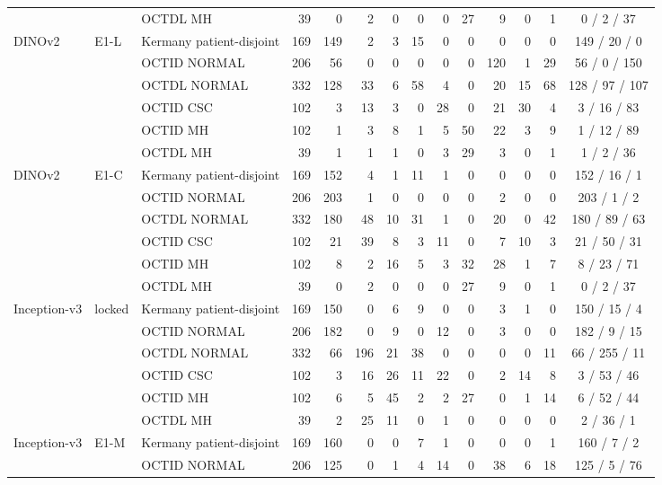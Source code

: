 \begin{longtable}{@{}lll rrrrrrrrrrc@{}}
 &  & OCTDL MH & 39 & 0 & 2 & 0 & 0 & 0 & 27 & 9 & 0 & 1 & 0 / 2 / 37 \\
\addlinespace[1pt]
DINOv2 & E1-L & Kermany patient-disjoint & 169 & 149 & 2 & 3 & 15 & 0 & 0 & 0 & 0 & 0 & 149 / 20 / 0 \\
 &  & OCTID NORMAL & 206 & 56 & 0 & 0 & 0 & 0 & 0 & 120 & 1 & 29 & 56 / 0 / 150 \\
 &  & OCTDL NORMAL & 332 & 128 & 33 & 6 & 58 & 4 & 0 & 20 & 15 & 68 & 128 / 97 / 107 \\
 &  & OCTID CSC & 102 & 3 & 13 & 3 & 0 & 28 & 0 & 21 & 30 & 4 & 3 / 16 / 83 \\
 &  & OCTID MH & 102 & 1 & 3 & 8 & 1 & 5 & 50 & 22 & 3 & 9 & 1 / 12 / 89 \\
 &  & OCTDL MH & 39 & 1 & 1 & 1 & 0 & 3 & 29 & 3 & 0 & 1 & 1 / 2 / 36 \\
\addlinespace[1pt]
DINOv2 & E1-C & Kermany patient-disjoint & 169 & 152 & 4 & 1 & 11 & 1 & 0 & 0 & 0 & 0 & 152 / 16 / 1 \\
 &  & OCTID NORMAL & 206 & 203 & 1 & 0 & 0 & 0 & 0 & 2 & 0 & 0 & 203 / 1 / 2 \\
 &  & OCTDL NORMAL & 332 & 180 & 48 & 10 & 31 & 1 & 0 & 20 & 0 & 42 & 180 / 89 / 63 \\
 &  & OCTID CSC & 102 & 21 & 39 & 8 & 3 & 11 & 0 & 7 & 10 & 3 & 21 / 50 / 31 \\
 &  & OCTID MH & 102 & 8 & 2 & 16 & 5 & 3 & 32 & 28 & 1 & 7 & 8 / 23 / 71 \\
 &  & OCTDL MH & 39 & 0 & 2 & 0 & 0 & 0 & 27 & 9 & 0 & 1 & 0 / 2 / 37 \\
\addlinespace[1pt]
Inception-v3 & locked & Kermany patient-disjoint & 169 & 150 & 0 & 6 & 9 & 0 & 0 & 3 & 1 & 0 & 150 / 15 / 4 \\
 &  & OCTID NORMAL & 206 & 182 & 0 & 9 & 0 & 12 & 0 & 3 & 0 & 0 & 182 / 9 / 15 \\
 &  & OCTDL NORMAL & 332 & 66 & 196 & 21 & 38 & 0 & 0 & 0 & 0 & 11 & 66 / 255 / 11 \\
 &  & OCTID CSC & 102 & 3 & 16 & 26 & 11 & 22 & 0 & 2 & 14 & 8 & 3 / 53 / 46 \\
 &  & OCTID MH & 102 & 6 & 5 & 45 & 2 & 2 & 27 & 0 & 1 & 14 & 6 / 52 / 44 \\
 &  & OCTDL MH & 39 & 2 & 25 & 11 & 0 & 1 & 0 & 0 & 0 & 0 & 2 / 36 / 1 \\
\addlinespace[1pt]
Inception-v3 & E1-M & Kermany patient-disjoint & 169 & 160 & 0 & 0 & 7 & 1 & 0 & 0 & 0 & 1 & 160 / 7 / 2 \\
 &  & OCTID NORMAL & 206 & 125 & 0 & 1 & 4 & 14 & 0 & 38 & 6 & 18 & 125 / 5 / 76 \\

\end{longtable}
